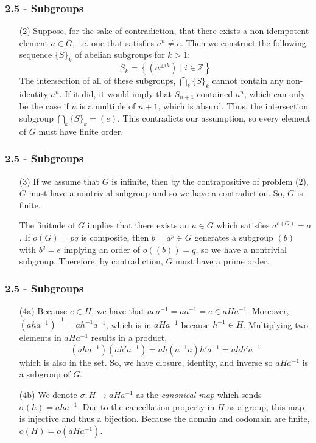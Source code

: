 \documentclass{beamer}
\begin{document}
\begin{frame}
\frametitle{2.5 - Subgroups}
\small
\begin{enumerate}
	\item[(2)] Suppose, for the sake of contradiction, that there exists a non-idempotent element $a\in G$, i.e. one that satisfies $a^n \neq e$. Then we construct the following sequence $\{S\}_k$ of abelian subgroups for $k > 1$:
	\begin{equation*}
	S_k = \left\{\left(a^{\pm ik}\right)\mid i\in\mathbb Z\right\}
	\end{equation*}
	The intersection of all of these subgroups, $\bigcap_k \{S\}_k$ cannot contain any non-identity $a^n$. If it did, it would imply that $S_{n+1}$ contained $a^n$, which can only be the case if $n$ is a multiple of $n+1$, which is absurd. Thus, the intersection subgroup $\bigcap_k \{S\}_k = (e)$. This contradicts our assumption, so every element of $G$ must have finite order.
\end{enumerate}
\end{frame}
\begin{frame}
\frametitle{2.5 - Subgroups}
\small
\begin{enumerate}
	\item[(3)] \quad If we assume that $G$ is infinite, then by the contrapositive of problem (2), $G$ must have a nontrivial subgroup and so we have a contradiction. So, $G$ is finite.
	
	\quad The finitude of $G$ implies that there exists an $a\in G$ which satisfies $a^{o(G)} = a$. If $o(G) = pq$ is composite, then $b = a^p\in G$ generates a subgroup $(b)$ with  $b^q = e$ implying an order of $o\left((b)\right) = q$, so we have a nontrivial subgroup. Therefore, by contradiction, $G$ must have a prime order.
\end{enumerate}
\end{frame}
\begin{frame}
\frametitle{2.5 - Subgroups}
\small
\begin{enumerate}
	\item[(4a)] Because $e\in H$, we have that $aea^{-1} = aa^{-1} = e \in aHa^{-1}$. Moreover, $(aha^{-1})^{-1} = ah^{-1}a^{-1}$, which is in $aHa^{-1}$ because $h^{-1}\in H$. Multiplying two elements in $aHa^{-1}$ results in a product,
	\begin{equation*}
	(aha^{-1})(ah'a^{-1}) = ah(a^{-1}a)h'a^{-1} = ahh'a^{-1}
	\end{equation*}
	which is also in the set. So, we have closure, identity, and inverse so $aHa^{-1}$ is a subgroup of $G$.
	\item[(4b)] We denote $\sigma: H\to aHa^{-1}$ as the \textit{canonical map} which sends $\sigma(h) = aha^{-1}$. Due to the cancellation property in $H$ as a group, this map is injective and thus a bijection. Because the domain and codomain are finite, $o(H) = o(aHa^{-1})$.
\end{enumerate}
\end{frame}
\end{document}
